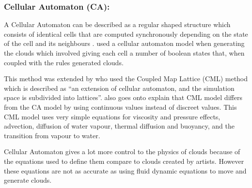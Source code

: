 \subsubsection{Cellular Automaton (CA):}
\label{sec:ca}
A Cellular Automaton can be described as a regular shaped structure which consists of identical cells that are computed synchronously depending on the state of the cell and its neighbours \citep{SDantchev11}.
\citet{DobashiEtAl00} used a cellular automaton model when generating the clouds which involved giving each cell a number of boolean states that, when coupled with the rules generated clouds.

This method was extended by \citet{Miyazaki01} who used the Coupled Map Lattice (CML) method which is described as “an extension of cellular automaton, and the simulation space is subdivided into lattices”.
\citet{Miyazaki01} also goes onto explain that CML model differs from the CA model by using continuous values instead of discreet values.
This CML model uses very simple equations for viscosity and pressure effects, advection, diffusion of water vapour, thermal diffusion and buoyancy, and the transition from vapour to water.

Cellular Automaton gives a lot more control to the physics of clouds because of the equations used to define them compare to clouds created by artists.
However these equations are not as accurate as using fluid dynamic equations to move and generate clouds.